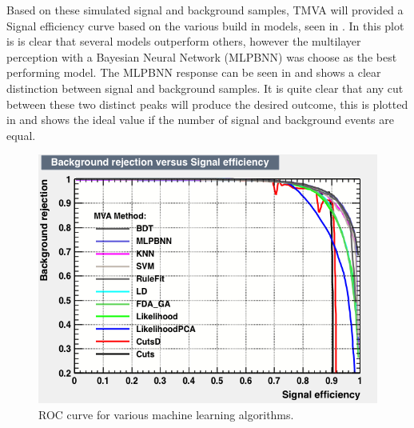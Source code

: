 Based on these simulated signal and background samples, TMVA will provided a Signal efficiency curve based on the various build in models, seen in . In this plot is is clear that several models outperform others, however the multilayer perception with a Bayesian Neural Network (MLPBNN) was choose as the best performing model. The MLPBNN response can be seen in  and shows a clear distinction between signal and background samples. It is quite clear that any cut between these two distinct peaks will produce the desired outcome, this is plotted in  and shows the ideal value if the number of signal and background events are equal.




\begin{figure}[h!]
\centering

\includegraphics[width=\textwidth]{figures/neutrinoTMVA/rejBvsS.png}
\caption{ROC curve for various machine learning algorithms.}
\label{fig:TMVANeuroc}
\end{figure}

